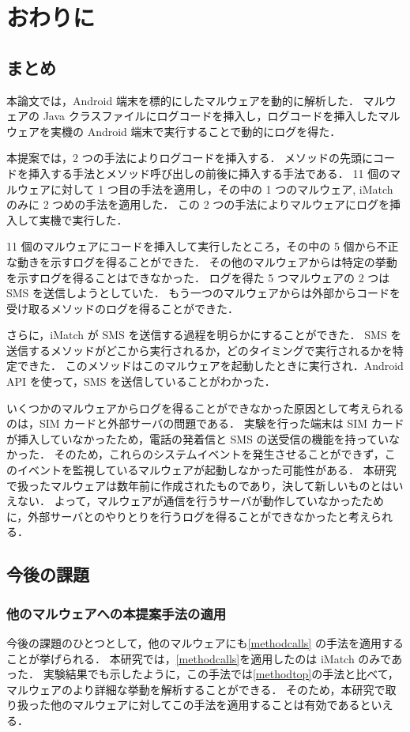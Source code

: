 \section{おわりに}
\label{sec:concl}
\subsection{まとめ}
本論文では，Android 端末を標的にしたマルウェアを動的に解析した．
マルウェアの Java クラスファイルにログコードを挿入し，ログコードを挿入したマルウェアを実機の Android 端末で実行することで動的にログを得た．

本提案では，2 つの手法によりログコードを挿入する．
メソッドの先頭にコードを挿入する手法とメソッド呼び出しの前後に挿入する手法である．
11 個のマルウェアに対して 1 つ目の手法を適用し，その中の 1 つのマルウェア, iMatch のみに 2 つめの手法を適用した．
この 2 つの手法によりマルウェアにログを挿入して実機で実行した．

11 個のマルウェアにコードを挿入して実行したところ，その中の 5 個から不正な動きを示すログを得ることができた．
その他のマルウェアからは特定の挙動を示すログを得ることはできなかった．
ログを得た 5 つマルウェアの 2 つは SMS を送信しようとしていた．
もう一つのマルウェアからは外部からコードを受け取るメソッドのログを得ることができた．

さらに，iMatch が SMS を送信する過程を明らかにすることができた．
SMS を送信するメソッドがどこから実行されるか，どのタイミングで実行されるかを特定できた．
このメソッドはこのマルウェアを起動したときに実行され．Android API を使って，SMS を送信していることがわかった．

いくつかのマルウェアからログを得ることができなかった原因として考えられるのは，SIM カードと外部サーバの問題である．
実験を行った端末は SIM カードが挿入していなかったため，電話の発着信と SMS の送受信の機能を持っていなかった．
そのため，これらのシステムイベントを発生させることができず，このイベントを監視しているマルウェアが起動しなかった可能性がある．
本研究で扱ったマルウェアは数年前に作成されたものであり，決して新しいものとはいえない．
よって，マルウェアが通信を行うサーバが動作していなかったために，外部サーバとのやりとりを行うログを得ることができなかったと考えられる．

\subsection{今後の課題}
\subsubsection{他のマルウェアへの本提案手法の適用}
今後の課題のひとつとして，他のマルウェアにも\ref{methodcalls} の手法を適用することが挙げられる．
本研究では，\ref{methodcalls}を適用したのは iMatch のみであった．
実験結果でも示したように，この手法では\ref{methodtop}の手法と比べて，マルウェアのより詳細な挙動を解析することができる．
そのため，本研究で取り扱った他のマルウェアに対してこの手法を適用することは有効であるといえる．

